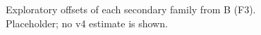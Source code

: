 \begin{figure}[t]
\centering{}
\caption{Exploratory offsets of each secondary family from B (F3). Placeholder; no v4 estimate is shown.}\label{fig:v4-F3}
\end{figure}
